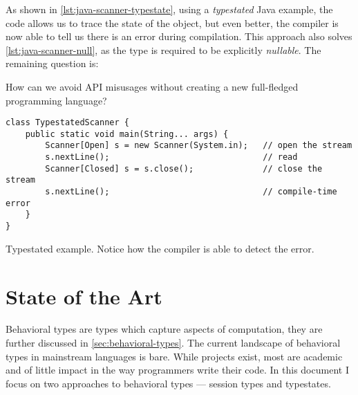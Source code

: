 As shown in \autoref{lst:java-scanner-typestate}, using a \emph{typestated} Java example,
the code allows us to trace the state of the object, but even better,
the compiler is now able to tell us there is an error during compilation.
This approach also solves \autoref{lst:java-scanner-null}, as the type is required to be explicitly \emph{nullable}.
The remaining question is:
\begin{displayquote}
    How can we avoid \gls{API} misusages without creating a new full-fledged programming language?
\end{displayquote}

\begin{listing}
    \begin{verbatim}
class TypestatedScanner {
    public static void main(String... args) {
        Scanner[Open] s = new Scanner(System.in);   // open the stream
        s.nextLine();                               // read
        Scanner[Closed] s = s.close();              // close the stream
        s.nextLine();                               // compile-time error
    }
}
    \end{verbatim}
    \caption{
        Typestated  example.
        Notice how the compiler is able to detect the error.
    }
    \label{lst:java-scanner-typestate}
\end{listing}

\section{State of the Art}\label{sec:state-of-the-art}

Behavioral types are types which capture aspects of computation, they are further discussed in \autoref{sec:behavioral-types}.
The current landscape of behavioral types in mainstream languages is bare.
While projects exist, most are academic and of little impact in the way programmers write their code.
In this document I focus on two approaches to behavioral types --- session types and typestates.

